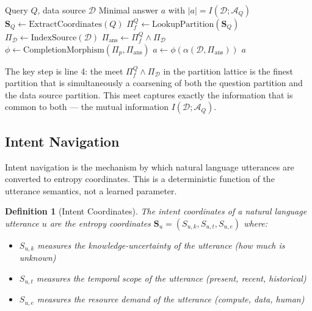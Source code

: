 \documentclass[12pt,twocolumn]{article}
\newtheorem{definition}{Definition}[section]
\begin{document}
\begin{algorithm}[H]
\caption{Surgical Data Access}
\label{alg:surgical}
\begin{algorithmic}[1]
\Require Query $Q$, data source $\mathcal{D}$
\Ensure Minimal answer $a$ with $|a| = I(\mathcal{D}; \mathcal{A}_Q)$
\State $\mathbf{S}_Q \leftarrow \text{ExtractCoordinates}(Q)$
\State $\Pi_f^Q \leftarrow \text{LookupPartition}(\mathbf{S}_Q)$ 
\State $\Pi_{\mathcal{D}} \leftarrow \text{IndexSource}(\mathcal{D})$ 
\State $\Pi_{\text{ans}} \leftarrow \Pi_f^Q \wedge \Pi_{\mathcal{D}}$ 
\State $\phi \leftarrow \text{CompletionMorphism}(\Pi_p, \Pi_{\text{ans}})$
\State $a \leftarrow \phi(\alpha(\mathcal{D}, \Pi_{\text{ans}}))$
\Return $a$
\end{algorithmic}
\end{algorithm}

The key step is line 4: the meet $\Pi_f^Q \wedge \Pi_{\mathcal{D}}$ in the partition lattice is the finest partition that is simultaneously a coarsening of both the question partition and the data source partition. This meet captures exactly the information that is common to both --- the mutual information $I(\mathcal{D}; \mathcal{A}_Q)$.

\subsection{Intent Navigation}

Intent navigation is the mechanism by which natural language utterances are converted to entropy coordinates. This is a deterministic function of the utterance semantics, not a learned parameter.

\begin{definition}[Intent Coordinates]
The intent coordinates of a natural language utterance $u$ are the entropy coordinates $\mathbf{S}_u = (S_{u,k}, S_{u,t}, S_{u,e})$ where:
\begin{itemize}
\item $S_{u,k}$ measures the knowledge-uncertainty of the utterance (how much is unknown)
\item $S_{u,t}$ measures the temporal scope of the utterance (present, recent, historical)
\item $S_{u,e}$ measures the resource demand of the utterance (compute, data, human)
\end{itemize}
\end{definition}
\end{document}
